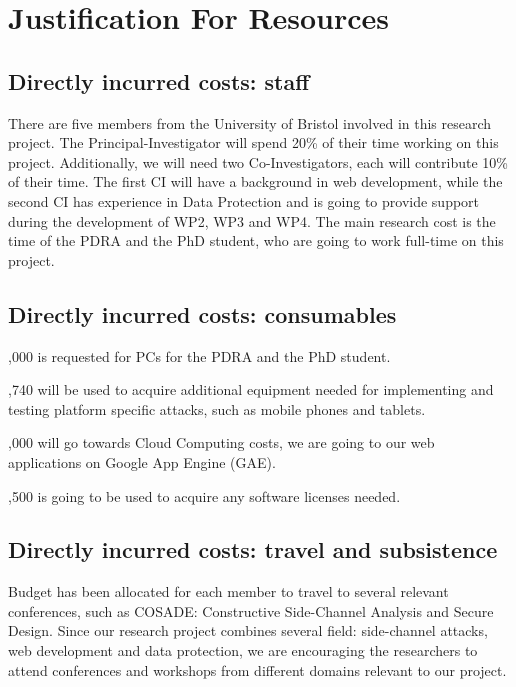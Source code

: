 \documentclass[a4paper,11pt]{article}
\begin{document}
\newpage
\section*{Justification For Resources}


\subsection*{Directly incurred costs: staff}
There are five members from the University of Bristol involved in this research project. The Principal-Investigator will spend 20\% of their time working on this project. Additionally, we will need two Co-Investigators, each will contribute 10\% of their time. The first CI will have a background in web development, while the second CI has experience in Data Protection and is going to provide support during the development of WP2, WP3 and WP4. The main research cost is the time of the PDRA and the PhD student, who are going to work full-time on this project.

\subsection*{Directly incurred costs: consumables}
,000 is requested for PCs for the PDRA and the PhD student.

,740 will be used to acquire additional equipment needed for implementing and testing platform specific attacks, such as mobile phones and tablets.

,000 will go towards Cloud Computing costs, we are going to our web applications on Google App Engine (GAE).

,500 is going to be used to acquire any software licenses needed.

\subsection*{Directly incurred costs: travel and subsistence}
Budget has been allocated for each member to travel to several relevant conferences, such as COSADE: Constructive Side-Channel Analysis and Secure Design. Since our research project combines several field: side-channel attacks, web development and data protection, we are encouraging the researchers to attend conferences and workshops from different domains relevant to our project.
\end{document}
